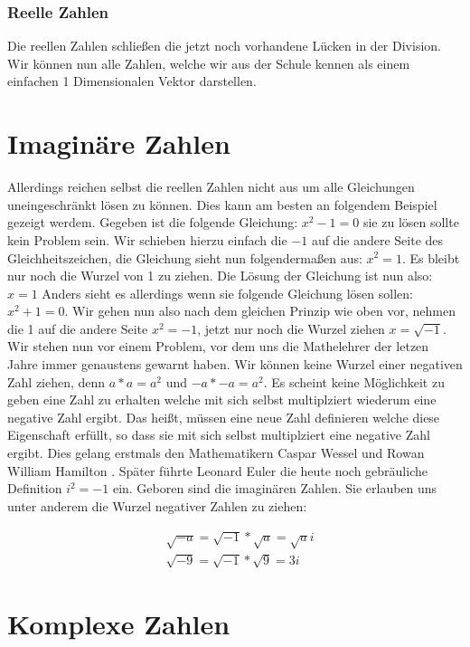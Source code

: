 \documentclass[a4paper, 12pt]{article}
\begin{document}
\subsubsection{Reelle Zahlen}
Die reellen Zahlen schließen die jetzt noch vorhandene Lücken in der Division. Wir können nun alle Zahlen, welche wir aus der Schule kennen als einem einfachen 1 Dimensionalen Vektor darstellen.

\section{Imaginäre Zahlen}
Allerdings reichen selbst die reellen Zahlen nicht aus um alle Gleichungen uneingeschränkt lösen zu können. 
Dies kann am besten an folgendem Beispiel gezeigt werdem.
Gegeben ist die folgende Gleichung: $x^2 - 1 = 0$ sie zu lösen sollte kein Problem sein.
Wir schieben hierzu einfach die $- 1$ auf die andere Seite des Gleichheitszeichen,  die Gleichung sieht nun folgendermaßen aus: $x^2 = 1$.
Es bleibt nur noch die Wurzel von 1 zu ziehen.
Die Lösung der Gleichung ist nun also: $x = 1$
Anders sieht es allerdings wenn sie folgende Gleichung lösen sollen: $x^2 + 1 = 0$.
Wir gehen nun also nach dem gleichen Prinzip wie oben vor, nehmen die 1 auf die andere Seite $x^2 = -1$, jetzt nur noch die Wurzel ziehen $x = \sqrt{-1}$.
Wir stehen nun vor einem Problem, vor dem uns die Mathelehrer der letzen Jahre immer genaustens gewarnt haben.
Wir können keine Wurzel einer negativen Zahl ziehen, denn $a * a = a^2$ und $-a * -a = a^2$. Es scheint keine Möglichkeit zu geben eine Zahl zu erhalten welche mit sich selbst multiplziert wiederum eine negative Zahl ergibt.
Das heißt, müssen eine neue Zahl definieren welche diese Eigenschaft erfüllt, so dass sie mit sich selbst multiplziert eine negative Zahl ergibt. Dies gelang erstmals den Mathematikern Caspar Wessel und Rowan William Hamilton \cite{i_def}. Später führte Leonard Euler die heute noch gebräuliche Definition $i^2 = -1$ ein. Geboren sind die imaginären Zahlen. Sie erlauben uns unter anderem die Wurzel negativer Zahlen zu ziehen: 

\begin{equation} \label{neg_sqrt}
  \begin{split}
   & \sqrt{-a} = \sqrt{-1} * \sqrt{a} = \sqrt{a}i \\
   & \sqrt{-9} = \sqrt{-1} * \sqrt{9} = 3i
  \end{split}
\end{equation}

\section{Komplexe Zahlen}
\end{document}
